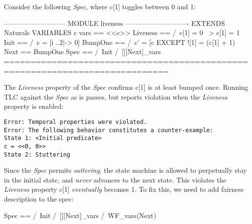 \documentclass{report}
\begin{document}
Consider the following \textit{Spec}, where c[1] toggles between 0 and 1:
\begin{tla}
--------------------------- MODULE liveness ----------------------------
EXTENDS Naturals
VARIABLES c
vars == <<c>>
Liveness == 
    /\ c[1] = 0 ~> c[1] = 1
Init ==
    /\ c = [i ..2|-> 0] 
BumpOne == 
    /\ c' = [c EXCEPT ![1] = (c[1] + 1) %
Next == 
    \/ BumpOne
Spec ==
  /\ Init
  /\ [][Next]_vars
=============================================================================
\end{tla}
\begin{tlatex}
\@x{}\moduleLeftDash{}\moduleRightDash\@xx{}%
%
%
%
%
%
%
%
%
%
%
%
%
%
\@x{}\bottombar\@xx{}%
\end{tlatex}

The \textit{Liveness} property of the \textit{Spec} confirms c[1] is at least
bumped once. Running TLC against the \textit{Spec} as is passes, but reports
violation when the \textit{Liveness} property is enabled:

\begin{verbatim}
Error: Temporal properties were violated.
Error: The following behavior constitutes a counter-example:
State 1: <Initial predicate>
c = <<0, 0>>
State 2: Stuttering
\end{verbatim}

Since the \textit{Spec} permits \textit{suttering}, the state machine is allowed
to perpetually stay in the initial state, and \textit{never} advances to the
next state. This violates the \textit{Liveness} property c[1]
\textit{eventually} becomes 1. To fix this, we need to add fairness description 
to the spec:\newline

\begin{tla}
Spec ==
  /\ Init
  /\ [][Next]_vars
  /\ WF_vars(Next)
\end{tla}
\begin{tlatex}
%
%
%
%
\end{tlatex}
\newline
\end{document}
